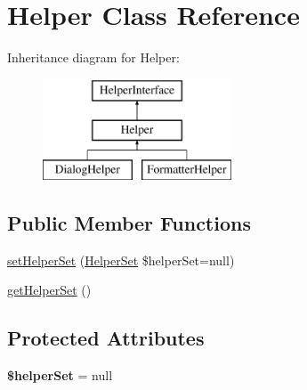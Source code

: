 \hypertarget{class_symfony_1_1_components_1_1_console_1_1_helper_1_1_helper}{
\section{Helper Class Reference}
\label{class_symfony_1_1_components_1_1_console_1_1_helper_1_1_helper}
}
Inheritance diagram for Helper:\begin{figure}[H]
\begin{center}
\leavevmode
\includegraphics[height=3.000000cm]{class_symfony_1_1_components_1_1_console_1_1_helper_1_1_helper}
\end{center}
\end{figure}
\subsection*{Public Member Functions}
\begin{DoxyCompactItemize}
\item 
\hyperlink{class_symfony_1_1_components_1_1_console_1_1_helper_1_1_helper_a3ee5113a3f774a7d5c2fe6dcfd047c77}{setHelperSet} (\hyperlink{class_symfony_1_1_components_1_1_console_1_1_helper_1_1_helper_set}{HelperSet} \$helperSet=null)
\item 
\hyperlink{class_symfony_1_1_components_1_1_console_1_1_helper_1_1_helper_ab1ffe5022cd0569add0ffdd3493e8ff0}{getHelperSet} ()
\end{DoxyCompactItemize}
\subsection*{Protected Attributes}
\begin{DoxyCompactItemize}
\item 
\hypertarget{class_symfony_1_1_components_1_1_console_1_1_helper_1_1_helper_a05c3de6d5a47b001eb8fb496025343ca}{
{\bfseries \$helperSet} = null}
\label{class_symfony_1_1_components_1_1_console_1_1_helper_1_1_helper_a05c3de6d5a47b001eb8fb496025343ca}

\end{DoxyCompactItemize}


